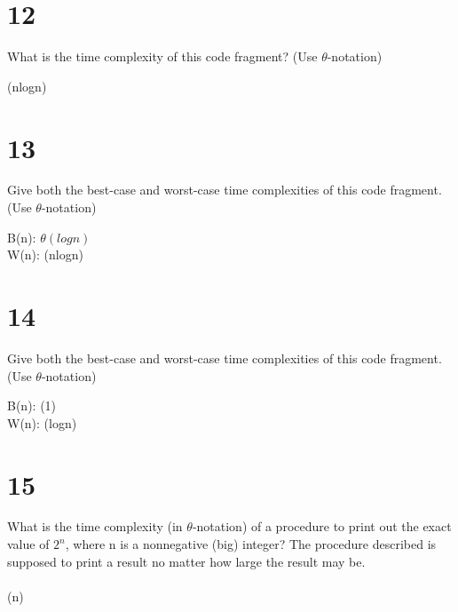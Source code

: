 \documentclass{article}
\begin{document}
\section*{12}
    \item What is the time complexity of this code fragment? (Use $\theta$-notation)
        \begin{shaded} 
        \theta (nlogn)
        \end{shaded}     



\section*{13}
    \item Give both the best-case and worst-case time complexities of this code fragment. (Use $\theta$-notation)
        \begin{shaded} 
        B(n): $\theta (logn)$
        \\W(n): \theta (nlogn)
        \end{shaded}     



\section*{14}
    \item Give both the best-case and worst-case time complexities of this code fragment. (Use $\theta$-notation)
        \begin{shaded} 
        B(n): \theta(1)
        \\{} W(n): \theta(logn)
        \end{shaded}    




\section*{15}
    \item What is the time complexity (in $\theta$-notation) of a procedure to print out the exact value of $2^{n}$, where n is a nonnegative (big) integer? The procedure described is supposed to print a result no matter how large the result may be.
    \\
    \\ \theta(n)
        
\end{document}
